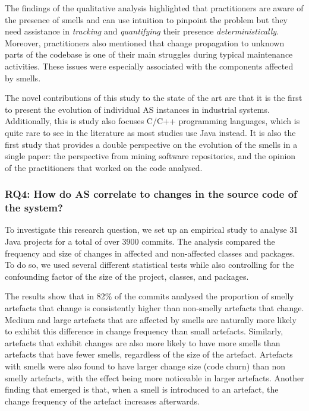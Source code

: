 The findings of the qualitative analysis highlighted that practitioners are aware of the presence of smells and can use intuition to pinpoint the problem but they need assistance in \emph{tracking} and \emph{quantifying} their presence \emph{deterministically}.
Moreover, practitioners also mentioned that change propagation to unknown parts of the codebase is one of their main struggles during typical maintenance activities.
These issues were especially associated with the components affected by smells. 

The novel contributions of this study to the state of the art are that it is the first to present the evolution of individual AS instances in industrial systems. Additionally, this is study also focuses C/C++ programming languages, which is quite rare to see in the literature as most studies use Java instead.
It is also the first study that provides a double perspective on the evolution of the smells in a single paper: the perspective from mining software repositories, and the opinion of the practitioners that worked on the code analysed.

\subsubsection*{RQ4: How do AS correlate to changes in the source code of the system?}
To investigate this research question, we set up an empirical study to analyse 31 Java projects for a total of over 3900 commits.
The analysis compared the frequency and size of changes in affected and non-affected classes and packages.
To do so, we used several different statistical tests while also controlling for the confounding factor of the size of the project, classes, and packages.

The results show that in 82\% of the commits analysed the proportion of smelly artefacts that change is consistently higher than non-smelly artefacts that change.
Medium and large artefacts that are affected by smells are naturally more likely to exhibit this difference in change frequency than small artefacts.
Similarly, artefacts that exhibit changes are also more likely to have more smells than artefacts that have fewer smells, regardless of the size of the artefact.
Artefacts with smells were also found to have larger change size (code churn) than non smelly artefacts, with the effect being more noticeable in larger artefacts.
Another finding that emerged is that, when a smell is introduced to an artefact, the change frequency of the artefact increases afterwards.

